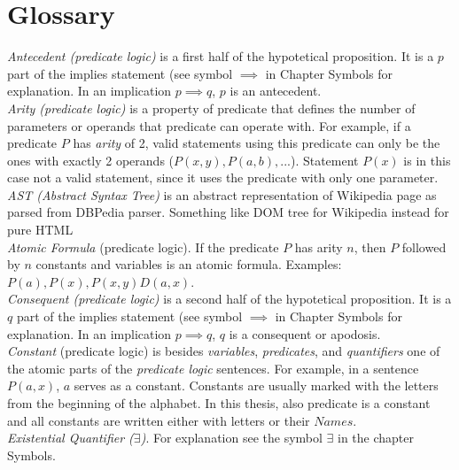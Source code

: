 % 
\chapter{Glossary}
\emph{Antecedent (predicate logic)} is a first half of the hypotetical 
proposition. It is a $p$ part of the implies statement (see symbol $\implies$ in
Chapter Symbols for explanation. In an implication $p \implies q$, $p$ is an
antecedent.\\

\emph{Arity (predicate logic)} is a property of predicate that defines the 
number of parameters or operands that predicate can operate with. For example,
if a predicate $P$ has \emph{arity} of 2, valid statements using this predicate
can only be the ones with exactly 2 operands ($P(x,y), P(a,b),...$). Statement
$P(x)$ is in this case not a valid statement, since it uses the predicate with
only one parameter.\\

\emph{AST (Abstract Syntax Tree)} is an abstract representation of Wikipedia 
page as parsed from DBPedia parser. Something like DOM tree for Wikipedia 
instead for pure HTML\\

\emph{Atomic Formula} (predicate logic). If the predicate $P$ has arity $n$,
then $P$ followed by $n$ constants and variables is an atomic formula. Examples:
$P(a), P(x), P(x,y) D(a,x)$.\\

\emph{Consequent (predicate logic)} is a second half of the hypotetical 
proposition. It is a $q$ part of the implies statement (see symbol $\implies$ in
Chapter Symbols for explanation. In an implication $p \implies q$, $q$ is a
consequent or apodosis.\\

\emph{Constant} (predicate logic) is besides \emph{variables}, 
\emph{predicates}, and \emph{quantifiers} one of the atomic parts of the 
\emph{predicate logic} sentences. For example, in a sentence $P(a,x)$, $a$ 
serves as a constant. Constants are usually marked with the letters from the
beginning of the alphabet. In this thesis, also predicate is a constant and
all constants are written either with letters or their $Names$.\\

\emph{Existential Quantifier ($\exists$)}. For explanation see the symbol
$\exists$ in the chapter Symbols.\\

